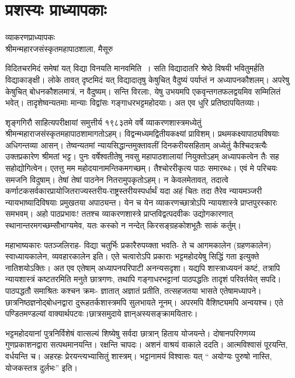 {\fontsize{15}{17}\selectfont
\presetvalues
\chapter{प्रशस्यः प्राध्यापकाः}

\begin{center}
\smallskip
व्याकरणप्राध्यापकः\\
श्रीमन्महारजसंस्कृतमहापाठशाला, मैसूरु
\addrule
\end{center}
विदितचरमिदं समेषां यत् विद्या विनयति मानवमिति~। सति विद्यादातरि श्रेष्ठे विषयी भवितुमर्हति विद्याकाङ्क्षी।  लोके तावत् दृष्टमिदं यत् विद्यादातृषु केषुचित् वैदुष्यं पर्याप्तं न अध्यापनकौशलम्। अपरेषु केषुचित् बोधनकौशलमात्रं, न वैदुष्यम्। सन्ति विरलाः, येषु उभयमपि एकवृन्तगतफलद्वयमिव सम्मिलितं भवेत्। तादृशेष्वन्यतमाः मान्याः विद्वांसः गङ्गाधरभट्टमहोदयाः। अत एव धुरि प्रतिष्ठापयितव्याः।

शृङ्गगिरौ साहित्यपरीक्षायां समुत्तीर्य १९८३तमे वर्षे व्याकरणशास्त्रमध्येतुं श्रीमन्महाराजसंस्कृतमहापाठशामागतोऽहम्। विद्वन्मध्यमद्वितीयकक्ष्यां प्राविशम्। प्रथमकक्ष्यापाठ्यविषयाः अधिगन्तव्या आसन्। तेष्वन्यतमां न्यायसिद्धान्तमुक्तावलीं दिनकरीयसहिताम् अध्येतुं कैश्चिदत्रत्यैः उक्तप्रकारेण श्रीमतां भट्ट। पुनः वर्षेश्वतीतेषु नवसु महापाठशालायां नियुक्तोऽहम् अध्यापकत्वेन तैः सह सहोद्योगित्वेन। एतत्तु मम महोदयानामन्तिकमगच्छम्। तैश्चोररीकृत्य पाठः समारब्धः। एवं मे परिचयः समजनि विदुषाम्। तेषां तेषां पाठनेन नितरामुपकृतोऽहम्। न केवलमेतावत्, तदात्वे कर्णाटकसर्वकारप्रायोजितराज्यस्तरीय-राष्ट्रस्तरीय\-स्पर्धार्थं यदा अहं चितः तदा तैरेव न्यायमञ्जरी न्यायभाष्यादिविषयाः प्रमुखतया अपाठ्यन्त। येन च येन व्याकरणच्छात्रोऽपि न्यायशास्त्रे प्राप्तपुरस्कारः समभवम्। अहो पाठप्रभावः! ततश्च व्याकरणशास्त्रे प्राप्तविद्वत्पदवीकः उद्योगकारणात् स्थानान्तरमगच्छम्सौभाग्यमेव, यतः कस्को न नन्देत् किरसङ्ग्रहकोशभूतैः साकं कर्तुम्।

महाभाष्यकारः पतञ्जलिराह- विद्या चतुर्भिः प्रकारैरुपय्क्ता भवति- ते च आगमकालेन (ग्रहणकालेन) स्वाध्यायकालेन, व्यवहारकालेन इति। एते चत्वारोऽपि प्रकाराः भट्टमहोदयेषु सिद्धिं गता इत्युक्ते नातिशयोऽक्तिः। अत एव एतेषाम् अध्यापनपरिपाटी अनन्यसदृशा। यद्यपि शास्त्राध्ययनं कष्टं, तत्रापि न्यायशास्त्रं कष्टतरमिति मनुते छात्रगणः, तथापि गङ्गाधरभट्टानां पाठपद्धतिः तादृशं परिवर्तयेत् सपदि। पाठपद्धतौ समाश्रितः कश्चन क्रमः- ज्ञातात् अज्ञातं प्रतीति, तत्सहजतया भासते एतेषामध्यापने। छात्रनिष्ठज्ञनोद्बोधनद्वारा दुरूहतर्कशास्त्रमपि सुलभायते नूनम्। अपरमपि वैशिष्ट्यमपि अन्वयश्च। एते पण्डितमण्डल्यां वाक्यार्थपटवः।छात्रसमुदाये ज्ञान्अस्यसङ्क्रामयितारः। 

भट्टमहोदयानां पुत्रनिर्विशेषं वात्सल्यं शिष्येषु सर्वदा छात्रान् हिताय योजयन्ते। दोषानपरिगणय्य गुणप्रकाशनद्वारा सत्पथमानयन्ति। रक्षन्ति चापदः। अशनं वाश्रयं वाकाले ददति। आत्मविश्वासं पूरयन्ति, वर्धयन्ति च। अहरहः प्रेरयन्त्यभ्यासितुं शास्त्रम्। भट्टानामयं विश्वासः यत् “ अयोग्यः पुरुषो नास्ति, योजकस्तत्र दुर्लभः” इति। 

}
